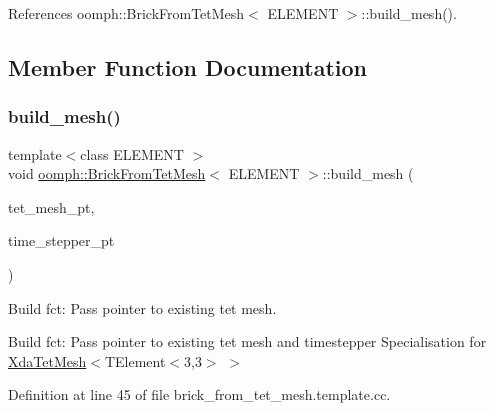 References oomph\+::\+Brick\+From\+Tet\+Mesh$<$ E\+L\+E\+M\+E\+N\+T $>$\+::build\+\_\+mesh().



\subsection{Member Function Documentation}
\mbox{\label{classoomph_1_1BrickFromTetMesh_a9b81e29d3b000f02764bf367fa762bfb}} 
\subsubsection{\texorpdfstring{build\+\_\+mesh()}{build\_mesh()}\hspace{0.1cm}{\footnotesize\ttfamily [1/2]}}
{\footnotesize\ttfamily template$<$class E\+L\+E\+M\+E\+NT $>$ \\
void \hyperlink{classoomph_1_1BrickFromTetMesh}{oomph\+::\+Brick\+From\+Tet\+Mesh}$<$ E\+L\+E\+M\+E\+NT $>$\+::build\+\_\+mesh (\begin{DoxyParamCaption}\item[{\hyperlink{classoomph_1_1XdaTetMesh}{Xda\+Tet\+Mesh}$<$ \hyperlink{classoomph_1_1TElement}{T\+Element}$<$ 3, 3 $>$ $>$ $\ast$}]{tet\+\_\+mesh\+\_\+pt,  }\item[{\hyperlink{classoomph_1_1TimeStepper}{Time\+Stepper} $\ast$}]{time\+\_\+stepper\+\_\+pt }\end{DoxyParamCaption})\hspace{0.3cm}{\ttfamily [private]}}



Build fct\+: Pass pointer to existing tet mesh. 

Build fct\+: Pass pointer to existing tet mesh and timestepper Specialisation for \hyperlink{classoomph_1_1XdaTetMesh}{Xda\+Tet\+Mesh}$<$T\+Element$<$3,3$>$ $>$ 

Definition at line 45 of file brick\+\_\+from\+\_\+tet\+\_\+mesh.\+template.\+cc.



